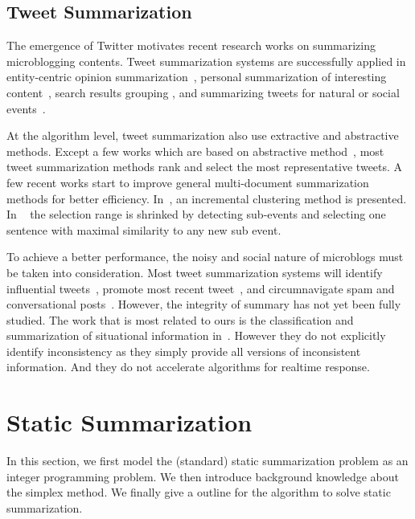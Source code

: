 \documentclass{llncs}
\begin{document}
\subsection{Tweet Summarization}
The emergence of Twitter motivates recent research works on summarizing microblogging contents. Tweet summarization systems are successfully applied in entity-centric opinion summarization~\cite{Meng2012Entitycentric}, personal summarization of interesting content~\cite{Ren2013Personalized,Chin2017TOTEM}, search results grouping \cite{Mathioudakis2010TwitterMonitor}, and summarizing tweets for natural or social events~\cite{Takamura2011Summarizing,Lin2012Generating,Rudra2015Extracting,Shou2013Sumblr,Liu2016LEDS,Gillani2017Post,Zubiaga2012Towards}.

At the algorithm level, tweet summarization also use extractive and abstractive methods. Except a few works which are based on abstractive method~\cite{Sharifi2010Summarizing}, most tweet summarization methods rank and select the most representative tweets. A few recent works start to improve general multi-document summarization methods for better efficiency. In~\cite{Shou2013Sumblr}, an incremental clustering method is presented. In ~\cite{Zubiaga2012Towards} the selection range is shrinked by detecting sub-events and selecting one sentence with maximal similarity to any new sub event.

To achieve a better performance, the noisy and social nature of microblogs must be taken into consideration. Most tweet summarization systems will identify influential tweets~\cite{Hannon2010Recommending},  promote most recent tweet~\cite{Efron2011Estimation}, and circumnavigate spam and conversational posts~\cite{Gillani2017Post}. However, the integrity of summary has not yet been fully studied. The work that is most related to ours is the 
classification and summarization of situational information in~\cite{Rudra2015Extracting,Rudra2016Summarizing}. However they do not explicitly identify inconsistency as they simply provide all versions of inconsistent information. And they do not accelerate algorithms for realtime response. 


\section{Static Summarization}\label{sec:static}
In this section, we first model the (standard) static summarization problem as an integer programming problem. We then introduce background knowledge about the simplex method. We finally give a outline for the algorithm to solve static summarization.
\end{document}
